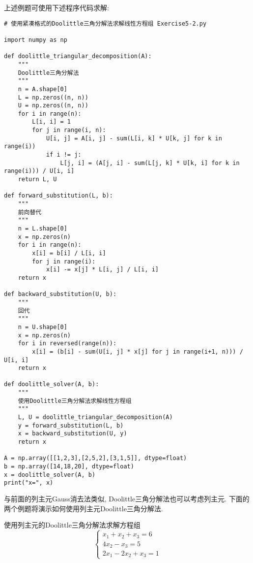上述例题可使用下述程序代码求解:
\begin{lstlisting}
# 使用紧凑格式的Doolittle三角分解法求解线性方程组 Exercise5-2.py

import numpy as np

def doolittle_triangular_decomposition(A):
    """
    Doolittle三角分解法
    """
    n = A.shape[0]
    L = np.zeros((n, n))
    U = np.zeros((n, n)) 
    for i in range(n):
        L[i, i] = 1
        for j in range(i, n):
            U[i, j] = A[i, j] - sum(L[i, k] * U[k, j] for k in range(i))
            if i != j:
                L[j, i] = (A[j, i] - sum(L[j, k] * U[k, i] for k in range(i))) / U[i, i]
    return L, U

def forward_substitution(L, b):
    """
    前向替代
    """
    n = L.shape[0]
    x = np.zeros(n) 
    for i in range(n):
        x[i] = b[i] / L[i, i]
        for j in range(i):
            x[i] -= x[j] * L[i, j] / L[i, i]
    return x

def backward_substitution(U, b):
    """
    回代
    """
    n = U.shape[0]
    x = np.zeros(n)
    for i in reversed(range(n)):
        x[i] = (b[i] - sum(U[i, j] * x[j] for j in range(i+1, n))) / U[i, i]
    return x

def doolittle_solver(A, b):
    """
    使用Doolittle三角分解法求解线性方程组
    """
    L, U = doolittle_triangular_decomposition(A)
    y = forward_substitution(L, b)
    x = backward_substitution(U, y)
    return x

A = np.array([[1,2,3],[2,5,2],[3,1,5]], dtype=float)
b = np.array([14,18,20], dtype=float)
x = doolittle_solver(A, b)
print("x=", x)
\end{lstlisting}

与前面的列主元Gauss消去法类似, Doolittle三角分解法也可以考虑列主元. 下面的两个例题将演示如何使用列主元Doolittle三角分解法.

\begin{example}\label{example: 矩阵列主元Doolittle三角分解法求解方程组}
    使用列主元的Doolittle三角分解法求解方程组
    \begin{equation*}
        \begin{cases}
            x_1+x_2+x_3=6\\
            4x_2-x_3=5\\
            2x_1-2x_2+x_3=1
        \end{cases}
    \end{equation*}
\end{example}

